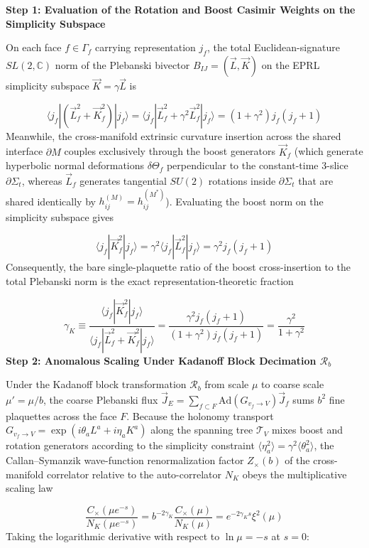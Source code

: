 \documentclass[aps,prd,onecolumn,superscriptaddress,nofootinbib,longbibliography,10pt]{revtex4-2}
\begin{document}
{{  \textbf{Step 1: Evaluation of the Rotation and Boost Casimir Weights on the Simplicity Subspace}


  On each face \(f \in \Gamma_f\) carrying representation \(j_f\), the total Euclidean-signature \(SL(2,\mathbb{C})\) norm of the Plebanski bivector \(B_{IJ} = (\vec{L}, \vec{K})\) on the EPRL simplicity subspace \(\vec{K} = \gamma\vec{L}\) is


  \[ \langle j_f | \left(\vec{L}_f^2 + \vec{K}_f^2\right) | j_f\rangle = \langle j_f | \vec{L}_f^2 + \gamma^2\vec{L}_f^2 | j_f\rangle = (1 + \gamma^2)j_f(j_f + 1) \]
  Meanwhile, the cross-manifold extrinsic curvature insertion across the shared interface \(\partial M\) couples exclusively through the boost generators \(\vec{K}_f\) (which generate hyperbolic normal deformations \(\delta\Theta_f\) perpendicular to the constant-time 3-slice \(\partial\Sigma_t\), whereas \(\vec{L}_f\) generates tangential \(SU(2)\) rotations inside \(\partial\Sigma_t\) that are shared identically by \(h_{ij}^{(M)} = h_{ij}^{(M^*)}\)). Evaluating the boost norm on the simplicity subspace gives


  \[ \langle j_f | \vec{K}_f^2 | j_f\rangle = \gamma^2\langle j_f | \vec{L}_f^2 | j_f\rangle = \gamma^2 j_f(j_f + 1) \]
  Consequently, the bare single-plaquette ratio of the boost cross-insertion to the total Plebanski norm is the exact representation-theoretic fraction


  \[ \gamma_K \equiv \frac{\langle j_f | \vec{K}_f^2 | j_f\rangle}{\langle j_f | \vec{L}_f^2 + \vec{K}_f^2 | j_f\rangle} = \frac{\gamma^2 j_f(j_f + 1)}{(1 + \gamma^2)j_f(j_f + 1)} = \frac{\gamma^2}{1 + \gamma^2} \]
  \textbf{Step 2: Anomalous Scaling Under Kadanoff Block Decimation \(\mathcal{R}_b\)}


  Under the Kadanoff block transformation \(\mathcal{R}_b\) from scale \(\mu\) to coarse scale \(\mu' = \mu/b\), the coarse Plebanski flux \(\vec{J}_E = \sum_{f\subset F} \text{Ad}(G_{v_f\to V})\vec{J}_f\) sums \(b^2\) fine plaquettes across the face \(F\). Because the holonomy transport \(G_{v_f\to V} = \exp(i\theta_a L^a + i\eta_a K^a)\) along the spanning tree \(\mathcal{T}_V\) mixes boost and rotation generators according to the simplicity constraint \(\langle\eta_a^2\rangle = \gamma^2\langle\theta_a^2\rangle\), the Callan–Symanzik wave-function renormalization factor \(Z_\times(b)\) of the cross-manifold correlator relative to the auto-correlator \(N_K\) obeys the multiplicative scaling law


  \[ \frac{C_\times(\mu e^{-s})}{N_K(\mu e^{-s})} = b^{-2\gamma_K}\frac{C_\times(\mu)}{N_K(\mu)} = e^{-2\gamma_K s}\xi^2(\mu) \]
  Taking the logarithmic derivative with respect to \(\ln\mu = -s\) at \(s = 0\):


}}
\end{document}
